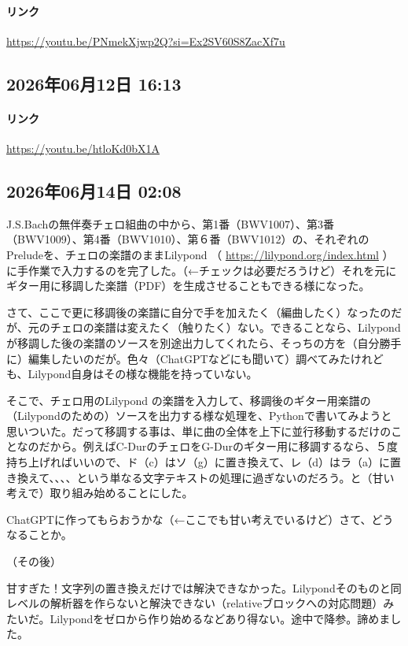 \paragraph{リンク}
\url{https://youtu.be/PNmekXjwp2Q?si=Ex2SV60S8ZacXf7u}

\subsection*{2026年06月12日 16:13}

\paragraph{リンク}
\url{https://youtu.be/htloKd0bX1A}

\subsection*{2026年06月14日 02:08}

J.S.Bachの無伴奏チェロ組曲の中から、第1番（BWV1007）、第3番（BWV1009）、第4番（BWV1010）、第６番（BWV1012）の、それぞれのPreludeを、チェロの楽譜のままLilypond （ \url{https://lilypond.org/index.html} ）に手作業で入力するのを完了した。（←チェックは必要だろうけど）それを元にギター用に移調した楽譜（PDF）を生成させることもできる様になった。

さて、ここで更に移調後の楽譜に自分で手を加えたく（編曲したく）なったのだが、元のチェロの楽譜は変えたく（触りたく）ない。できることなら、Lilypondが移調した後の楽譜のソースを別途出力してくれたら、そっちの方を（自分勝手に）編集したいのだが。色々（ChatGPTなどにも聞いて）調べてみたけれども、Lilypond自身はその様な機能を持っていない。

そこで、チェロ用のLilypond の楽譜を入力して、移調後のギター用楽譜の（Lilypondのための）ソースを出力する様な処理を、Pythonで書いてみようと思いついた。だって移調する事は、単に曲の全体を上下に並行移動するだけのことなのだから。例えばC-DurのチェロをG-Durのギター用に移調するなら、５度持ち上げればいいので、ド（c）はソ（g）に置き換えて、レ（d）はラ（a）に置き換えて、、、、という単なる文字テキストの処理に過ぎないのだろう。と（甘い考えで）取り組み始めることにした。

ChatGPTに作ってもらおうかな（←ここでも甘い考えでいるけど）さて、どうなることか。

（その後）

甘すぎた！文字列の置き換えだけでは解決できなかった。Lilypondそのものと同レベルの解析器を作らないと解決できない（relativeブロックへの対応問題）みたいだ。Lilypondをゼロから作り始めるなどあり得ない。途中で降参。諦めました。

